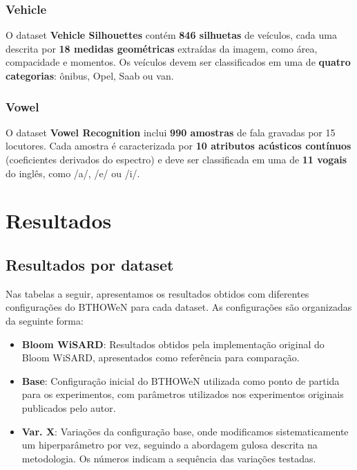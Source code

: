 \documentclass{article}
\begin{document}
\subsubsection{Vehicle}

O dataset \textbf{Vehicle Silhouettes} contém \textbf{846 silhuetas} de veículos, cada uma descrita por \textbf{18 medidas geométricas} extraídas da imagem, como área, compacidade e momentos. Os veículos devem ser classificados em uma de \textbf{quatro categorias}: ônibus, Opel, Saab ou van.

\subsubsection{Vowel}

O dataset \textbf{Vowel Recognition} inclui \textbf{990 amostras} de fala gravadas por 15 locutores. Cada amostra é caracterizada por \textbf{10 atributos acústicos contínuos} (coeficientes derivados do espectro) e deve ser classificada em uma de \textbf{11 vogais} do inglês, como /a/, /e/ ou /i/.

\section{Resultados}

\subsection{Resultados por dataset}

Nas tabelas a seguir, apresentamos os resultados obtidos com diferentes configurações do BTHOWeN para cada dataset. As configurações são organizadas da seguinte forma:

\begin{itemize}
    \item \textbf{Bloom WiSARD}: Resultados obtidos pela implementação original do Bloom WiSARD, apresentados como referência para comparação.
    \item \textbf{Base}: Configuração inicial do BTHOWeN utilizada como ponto de partida para os experimentos, com parâmetros utilizados nos experimentos originais publicados pelo autor.
    \item \textbf{Var. X}: Variações da configuração base, onde modificamos sistematicamente um hiperparâmetro por vez, seguindo a abordagem gulosa descrita na metodologia. Os números indicam a sequência das variações testadas.
\end{itemize}
\end{document}
